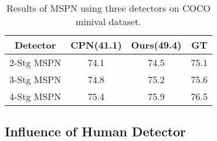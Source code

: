 \documentclass[10pt,twocolumn,letterpaper]{article}
\begin{document}
\begin{table}[h]
	\begin{spacing}{1.1}
		\begin{center}
			\begin{tabular}{c|c c c}
				\hline
				Detector & CPN(41.1) & Ours(49.4) & GT \\
				\hline
				2-Stg MSPN & 74.1 & 74.5 & 75.1 \\
				3-Stg MSPN & 74.8 & 75.2 & 75.6 \\
				4-Stg MSPN & 75.4 & 75.9 & 76.5 \\
				\hline
			\end{tabular}
		\end{center}
		\caption{Results of MSPN using three detectors on COCO minival dataset.}
		\label{tab:detection}
	\end{spacing}
\end{table}

\subsection{Influence of Human Detector}
\end{document}
